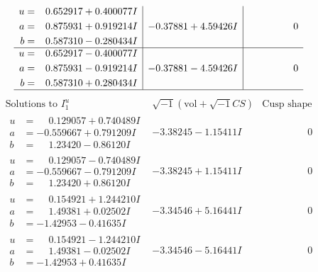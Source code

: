 \documentclass[1p]{elsarticle_modified}
\theoremstyle{definition}
\newcommand{\I}{\sqrt{-1}}
\begin{document}
$$\begin{array}{c|c|c}
\begin{aligned}
u &= \phantom{-}0.652917 + 0.400077 I \\
a &= \phantom{-}0.875931 + 0.919214 I \\
b &= \phantom{-}0.587310 - 0.280434 I\end{aligned}
 & -0.37881 + 4.59426 I & \phantom{-0.000000 } 0 \\ \hline\begin{aligned}
u &= \phantom{-}0.652917 - 0.400077 I \\
a &= \phantom{-}0.875931 - 0.919214 I \\
b &= \phantom{-}0.587310 + 0.280434 I\end{aligned}
 & -0.37881 - 4.59426 I & \phantom{-0.000000 } 0\\
 \hline 
 \end{array}$$\newpage$$\begin{array}{c|c|c}  
\text{Solutions to }I^u_{1}& \I (\text{vol} + \sqrt{-1}CS) & \text{Cusp shape}\\
 \hline 
\begin{aligned}
u &= \phantom{-}0.129057 + 0.740489 I \\
a &= -0.559667 + 0.791209 I \\
b &= \phantom{-}1.23420 - 0.86120 I\end{aligned}
 & -3.38245 - 1.15411 I & \phantom{-0.000000 } 0 \\ \hline\begin{aligned}
u &= \phantom{-}0.129057 - 0.740489 I \\
a &= -0.559667 - 0.791209 I \\
b &= \phantom{-}1.23420 + 0.86120 I\end{aligned}
 & -3.38245 + 1.15411 I & \phantom{-0.000000 } 0 \\ \hline\begin{aligned}
u &= \phantom{-}0.154921 + 1.244210 I \\
a &= \phantom{-}1.49381 + 0.02502 I \\
b &= -1.42953 - 0.41635 I\end{aligned}
 & -3.34546 + 5.16441 I & \phantom{-0.000000 } 0 \\ \hline\begin{aligned}
u &= \phantom{-}0.154921 - 1.244210 I \\
a &= \phantom{-}1.49381 - 0.02502 I \\
b &= -1.42953 + 0.41635 I\end{aligned}
 & -3.34546 - 5.16441 I & \phantom{-0.000000 } 0 \\ \hline\begin{aligned}

\end{aligned}
\end{array}$$
\end{document}
